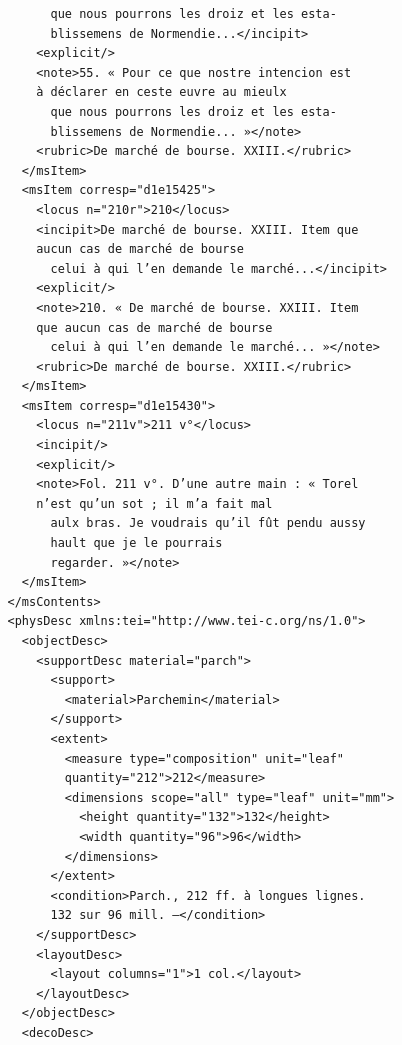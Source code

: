 \documentclass[a4paper,12pt,twoside]{book}
\begin{document}
\begin{verbatim}
                      que nous pourrons les droiz et les esta- 
                      blissemens de Normendie...</incipit>
                    <explicit/>
                    <note>55. « Pour ce que nostre intencion est 
                    à déclarer en ceste euvre au mieulx
                      que nous pourrons les droiz et les esta-
                      blissemens de Normendie... »</note>
                    <rubric>De marché de bourse. XXIII.</rubric>
                  </msItem>
                  <msItem corresp="d1e15425">
                    <locus n="210r">210</locus>
                    <incipit>De marché de bourse. XXIII. Item que 
                    aucun cas de marché de bourse
                      celui à qui l’en demande le marché...</incipit>
                    <explicit/>
                    <note>210. « De marché de bourse. XXIII. Item
                    que aucun cas de marché de bourse
                      celui à qui l’en demande le marché... »</note>
                    <rubric>De marché de bourse. XXIII.</rubric>
                  </msItem>
                  <msItem corresp="d1e15430">
                    <locus n="211v">211 v°</locus>
                    <incipit/>
                    <explicit/>
                    <note>Fol. 211 v°. D’une autre main : « Torel 
                    n’est qu’un sot ; il m’a fait mal
                      aulx bras. Je voudrais qu’il fût pendu aussy 
                      hault que je le pourrais
                      regarder. »</note>
                  </msItem>
                </msContents>
                <physDesc xmlns:tei="http://www.tei-c.org/ns/1.0">
                  <objectDesc>
                    <supportDesc material="parch">
                      <support>
                        <material>Parchemin</material>
                      </support>
                      <extent>
                        <measure type="composition" unit="leaf" 
                        quantity="212">212</measure>
                        <dimensions scope="all" type="leaf" unit="mm">
                          <height quantity="132">132</height>
                          <width quantity="96">96</width>
                        </dimensions>
                      </extent>
                      <condition>Parch., 212 ff. à longues lignes.
                      132 sur 96 mill. —</condition>
                    </supportDesc>
                    <layoutDesc>
                      <layout columns="1">1 col.</layout>
                    </layoutDesc>
                  </objectDesc>
                  <decoDesc>

\end{verbatim}
\end{document}
